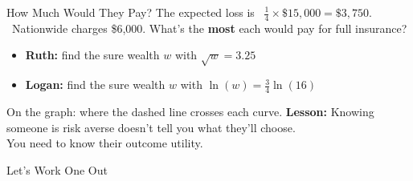 \begin{frame}{How Much Would They Pay?}
The expected loss is \ $\tfrac14\times\$15{,}000=\$3{,}750$. \ Nationwide charges \$6,000.
\bsk
What's the \textbf{most} each would pay for full insurance?
\bsk
\begin{itemize}
    \item \textbf{Ruth:} find the sure wealth $w$ with $\sqrt{w}=3.25$
      \vspace{0.5in}
    \item \textbf{Logan:} find the sure wealth $w$ with $\ln(w)=\tfrac34\ln(16)$
      \vspace{0.5in}
\end{itemize}
{\footnotesize On the graph: where the dashed line crosses each curve.}
\vfill
\textbf{Lesson:} Knowing someone is risk averse doesn't tell you what they'll choose.\\
You need to know their outcome utility.
\vspace{-0.3in}
\end{frame}


\begin{frame}[standout]
Let's Work One Out
\end{frame}

